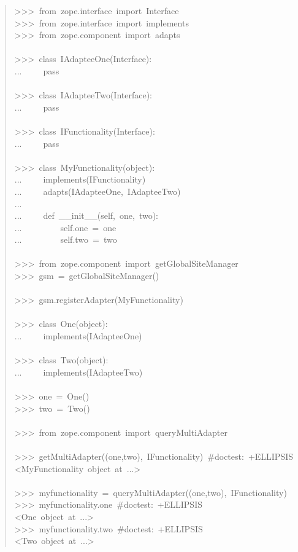 \documentclass[a4paper,openany,twoside,final]{book}
\begin{document}
\begin{quote}{\ttfamily \raggedright \noindent
>{}>{}>~from~zope.interface~import~Interface\\
>{}>{}>~from~zope.interface~import~implements\\
>{}>{}>~from~zope.component~import~adapts\\
~\\
>{}>{}>~class~IAdapteeOne(Interface):\\
...~~~~~pass\\
~\\
>{}>{}>~class~IAdapteeTwo(Interface):\\
...~~~~~pass\\
~\\
>{}>{}>~class~IFunctionality(Interface):\\
...~~~~~pass\\
~\\
>{}>{}>~class~MyFunctionality(object):\\
...~~~~~implements(IFunctionality)\\
...~~~~~adapts(IAdapteeOne,~IAdapteeTwo)\\
...\\
...~~~~~def~\_\_init\_\_(self,~one,~two):\\
...~~~~~~~~~self.one~=~one\\
...~~~~~~~~~self.two~=~two\\
~\\
>{}>{}>~from~zope.component~import~getGlobalSiteManager\\
>{}>{}>~gsm~=~getGlobalSiteManager()\\
~\\
>{}>{}>~gsm.registerAdapter(MyFunctionality)\\
~\\
>{}>{}>~class~One(object):\\
...~~~~~implements(IAdapteeOne)\\
~\\
>{}>{}>~class~Two(object):\\
...~~~~~implements(IAdapteeTwo)\\
~\\
>{}>{}>~one~=~One()\\
>{}>{}>~two~=~Two()\\
~\\
>{}>{}>~from~zope.component~import~queryMultiAdapter\\
~\\
>{}>{}>~getMultiAdapter((one,two),~IFunctionality)~\#doctest:~+ELLIPSIS\\
<MyFunctionality~object~at~...>\\
~\\
>{}>{}>~myfunctionality~=~queryMultiAdapter((one,two),~IFunctionality)\\
>{}>{}>~myfunctionality.one~\#doctest:~+ELLIPSIS\\
<One~object~at~...>\\
>{}>{}>~myfunctionality.two~\#doctest:~+ELLIPSIS\\
<Two~object~at~...>
}
\end{quote}
\end{document}
